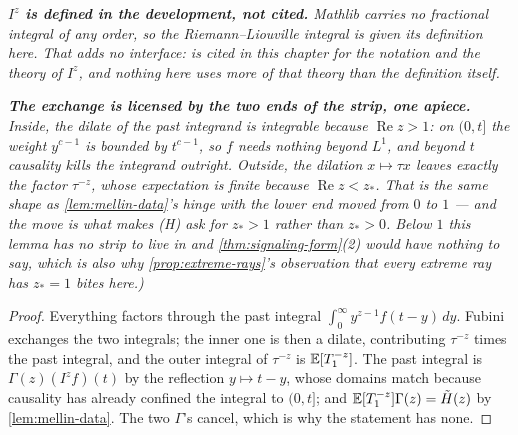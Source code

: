 \begin{lemma}
\emph{\textbf{$I^z$ is defined in the development, not cited.} Mathlib carries no fractional
integral of any order, so the Riemann--Liouville integral is given its definition here. That adds
no interface:  is cited in this chapter for the notation and the
theory of $I^z$, and nothing here uses more of that theory than the definition itself.}

\emph{\textbf{The exchange is licensed by the two ends of the strip, one apiece.} Inside, the
dilate of the past integrand is integrable because $\operatorname{Re} z > 1$: on $(0,t]$ the
weight $y^{c-1}$ is bounded by $t^{c-1}$, so $f$ needs nothing beyond $L^1$, and beyond $t$
causality kills the integrand outright. Outside, the dilation $x \mapsto \tau x$ leaves exactly
the factor $\tau^{-z}$, whose expectation is finite because $\operatorname{Re} z < z_*$. That is
the same shape as \ref{lem:mellin-data}'s hinge with the lower end moved from $0$ to $1$ --- and
the move is what \emph{makes} (H) ask for $z_* > 1$ rather than $z_* > 0$. Below $1$ this lemma
has no strip to live in and \ref{thm:signaling-form}(2) would have nothing to say, which is also
why \ref{prop:extreme-rays}'s observation that every extreme ray has $z_* = 1$ bites here.)}
\end{lemma}

\begin{proof}
\leanok
{}
Everything factors through the past integral $\int_0^\infty y^{z-1}f(t-y)\,dy$. Fubini exchanges
the two integrals; the inner one is then a dilate, contributing $\tau^{-z}$ times the past
integral, and the outer integral of $\tau^{-z}$ is $\mathbb{E}[T_1^{-z}]$. The past integral is
$\Gamma(z)(I^zf)(t)$ by the reflection $y \mapsto t-y$, whose domains match because causality has
already confined the integral to $(0,t]$; and $\mathbb{E}[T_1^{-z}]\Gamma(z) = \tilde H(z)$ by
\ref{lem:mellin-data}. The two $\Gamma$'s cancel, which is why the statement has none.
\end{proof}


